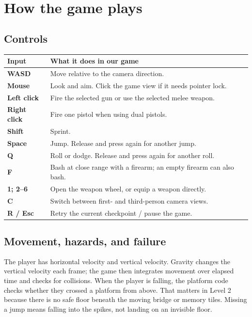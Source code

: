 \documentclass[11pt,a4paper]{article}
\begin{document}
\section{How the game plays}

\subsection{Controls}

\begin{tabularx}{\textwidth}{>{\bfseries}p{} X}
  \toprule
  Input & What it does in our game \\
  \midrule
  WASD & Move relative to the camera direction. \\
  Mouse & Look and aim. Click the game view if it needs pointer lock. \\
  Left click & Fire the selected gun or use the selected melee weapon. \\
  Right click & Fire one pistol when using dual pistols. \\
  Shift & Sprint. \\
  Space & Jump. Release and press again for another jump. \\
  Q & Roll or dodge. Release and press again for another roll. \\
  F & Bash at close range with a firearm; an empty firearm can also bash. \\
  1; 2--6 & Open the weapon wheel, or equip a weapon directly. \\
  C & Switch between first- and third-person camera views. \\
  R / Esc & Retry the current checkpoint / pause the game. \\
  \bottomrule
\end{tabularx}

\subsection{Movement, hazards, and failure}

The player has horizontal velocity and vertical velocity. Gravity changes the vertical velocity each frame; the game then integrates movement over elapsed time and checks for collisions. When the player is falling, the platform code checks whether they crossed a platform from above. That matters in Level 2 because there is no safe floor beneath the moving bridge or memory tiles. Missing a jump means falling into the spikes, not landing on an invisible floor.
\end{document}
